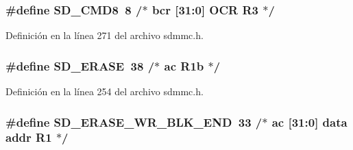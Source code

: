 \subsubsection[{\texorpdfstring{S\+D\+\_\+\+C\+M\+D8}{SD_CMD8}}]{\setlength{\rightskip}{0pt plus 5cm}\#define S\+D\+\_\+\+C\+M\+D8~8		/$\ast$ bcr  \mbox{[}31\+:0\mbox{]}  O\+CR        R3  $\ast$/}\hypertarget{group___c_h_i_p___s_d_m_m_c___definitions_ga43d18e10a9e461ee16164a7e315df427}{}\label{group___c_h_i_p___s_d_m_m_c___definitions_ga43d18e10a9e461ee16164a7e315df427}


Definición en la línea 271 del archivo sdmmc.\+h.

\subsubsection[{\texorpdfstring{S\+D\+\_\+\+E\+R\+A\+SE}{SD_ERASE}}]{\setlength{\rightskip}{0pt plus 5cm}\#define S\+D\+\_\+\+E\+R\+A\+SE~38		/$\ast$ ac                      R1b $\ast$/}\hypertarget{group___c_h_i_p___s_d_m_m_c___definitions_gac3983bddcc22da81f3c50b2c40f990ea}{}\label{group___c_h_i_p___s_d_m_m_c___definitions_gac3983bddcc22da81f3c50b2c40f990ea}


Definición en la línea 254 del archivo sdmmc.\+h.

\subsubsection[{\texorpdfstring{S\+D\+\_\+\+E\+R\+A\+S\+E\+\_\+\+W\+R\+\_\+\+B\+L\+K\+\_\+\+E\+ND}{SD_ERASE_WR_BLK_END}}]{\setlength{\rightskip}{0pt plus 5cm}\#define S\+D\+\_\+\+E\+R\+A\+S\+E\+\_\+\+W\+R\+\_\+\+B\+L\+K\+\_\+\+E\+ND~33		/$\ast$ ac   \mbox{[}31\+:0\mbox{]}  data addr  R1  $\ast$/}\hypertarget{group___c_h_i_p___s_d_m_m_c___definitions_ga008a20c6f234c1ca2e8f2dc5a3b1d5f7}{}\label{group___c_h_i_p___s_d_m_m_c___definitions_ga008a20c6f234c1ca2e8f2dc5a3b1d5f7}


